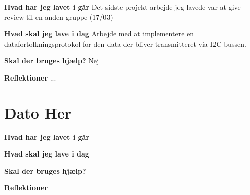\documentclass{article}
\begin{document}
	\textbf{Hvad har jeg lavet i går}
	Det sidste projekt arbejde jeg lavede var at give review til en anden gruppe (17/03)
	
	\textbf{Hvad skal jeg lave i dag}
	Arbejde med at implementere en datafortolkningsprotokol for den data der bliver transmitteret via I2C bussen.
	
	\textbf{Skal der bruges hjælp?}
	Nej
	
	\textbf{Reflektioner}
	...
	
	\section{Dato Her}
	
	\textbf{Hvad har jeg lavet i går}
	
	\textbf{Hvad skal jeg lave i dag}
	
	\textbf{Skal der bruges hjælp?}
	
	\textbf{Reflektioner}
	
	
\end{document}
